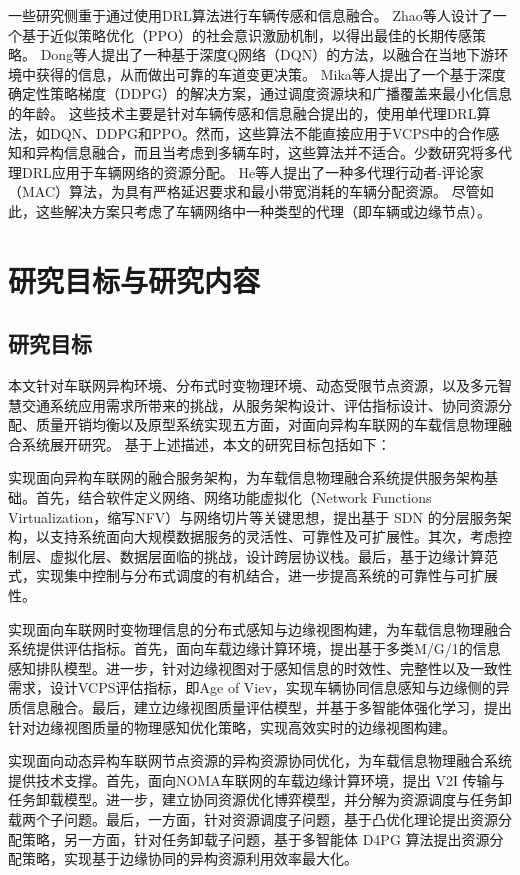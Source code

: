 一些研究侧重于通过使用DRL算法进行车辆传感和信息融合。
Zhao等人\cite{zhao2020social}设计了一个基于近似策略优化（PPO）的社会意识激励机制，以得出最佳的长期传感策略。
Dong等人\cite{dong2020spatio}提出了一种基于深度Q网络（DQN）的方法，以融合在当地下游环境中获得的信息，从而做出可靠的车道变更决策。
Mika等人\cite{mlika2022deep}提出了一个基于深度确定性策略梯度（DDPG）的解决方案，通过调度资源块和广播覆盖来最小化信息的年龄。
这些技术主要是针对车辆传感和信息融合提出的，使用单代理DRL算法，如DQN、DDPG和PPO。然而，这些算法不能直接应用于VCPS中的合作感知和异构信息融合，而且当考虑到多辆车时，这些算法并不适合。少数研究将多代理DRL应用于车辆网络的资源分配。
He等人\cite{he2021efficient}提出了一种多代理行动者-评论家（MAC）算法，为具有严格延迟要求和最小带宽消耗的车辆分配资源。
尽管如此，这些解决方案只考虑了车辆网络中一种类型的代理（即车辆或边缘节点）。

\section{研究目标与研究内容}\label{section 1-4}
\subsection{研究目标}

本文针对车联网异构环境、分布式时变物理环境、动态受限节点资源，以及多元智慧交通系统应用需求所带来的挑战，从服务架构设计、评估指标设计、协同资源分配、质量开销均衡以及原型系统实现五方面，对面向异构车联网的车载信息物理融合系统展开研究。
基于上述描述，本文的研究目标包括如下：

 实现面向异构车联网的融合服务架构，为车载信息物理融合系统提供服务架构基础。首先，结合软件定义网络、网络功能虚拟化（Network Functions Virtualization，缩写NFV）与网络切片等关键思想，提出基于 SDN 的分层服务架构，以支持系统面向大规模数据服务的灵活性、可靠性及可扩展性。其次，考虑控制层、虚拟化层、数据层面临的挑战，设计跨层协议栈。最后，基于边缘计算范式，实现集中控制与分布式调度的有机结合，进一步提高系统的可靠性与可扩展性。

 实现面向车联网时变物理信息的分布式感知与边缘视图构建，为车载信息物理融合系统提供评估指标。首先，面向车载边缘计算环境，提出基于多类M/G/1的信息感知排队模型。进一步，针对边缘视图对于感知信息的时效性、完整性以及一致性需求，设计VCPS评估指标，即Age of Viev，实现车辆协同信息感知与边缘侧的异质信息融合。最后，建立边缘视图质量评估模型，并基于多智能体强化学习，提出针对边缘视图质量的物理感知优化策略，实现高效实时的边缘视图构建。

 实现面向动态异构车联网节点资源的异构资源协同优化，为车载信息物理融合系统提供技术支撑。首先，面向NOMA车联网的车载边缘计算环境，提出 V2I 传输与任务卸载模型。进一步，建立协同资源优化博弈模型，并分解为资源调度与任务卸载两个子问题。最后，一方面，针对资源调度子问题，基于凸优化理论提出资源分配策略，另一方面，针对任务卸载子问题，基于多智能体 D4PG 算法提出资源分配策略，实现基于边缘协同的异构资源利用效率最大化。

